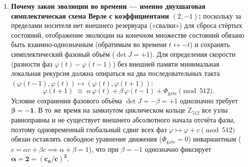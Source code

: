 \begin{enumerate}[label=\textbf{Шаг \arabic*.},leftmargin=*]
\begin{itemize}[noitemsep]
  \item $\mathbf{O_2(3)}$ ($|\mathbf{e}|^2 = d - 1 = 2$, $\mathbf{12}$~\textbf{рёберных диагональных соседей} $(\pm 1,\pm 1,0)$, $(\pm 1,0,\pm 1)$, $(0,\pm 1,\pm 1)$ --- архимедов \textbf{кубооктаэдр}): в каждой координатной плоскости содержит ровно $4$ вершины экваториального квадрата, а вдоль каждой оси $e_\alpha$ имеет $8$ вершин с $e_\alpha = \pm 1$ и $4$ вершины с $e_\alpha = 0$, что даёт изотропный тензор второго момента
    \begin{equation}
      \label{eq:mono-isotropy-tensor}
      M_{\alpha\beta} \;=\; \sum_{\mathbf{e} \in O_2(3)} e_\alpha e_\beta \;=\; (4 + 4)\,\delta_{\alpha\beta} \;=\; 8\,\delta_{\alpha\beta} \;=\; |{\triangle}(3)|\,\delta_{\alpha\beta}
    \end{equation}
    и ненулевое межосевое сцепление $\sum_{\mathbf{e}\in O_2(3)} e_x^2 e_y^2 = 4 = \frac{1}{2}\sum_{\mathbf{e}\in O_2(3)} e_x^4$, благодаря чему оператор $\frac{1}{4}\sum_{\mathbf{e}\in O_2(3)}(f(\mathbf{e}) - f(\mathbf{0}))$ точно равна непрерывному лапласиану $\Delta f(\mathbf{0})$ на всех квадратичных полиномах.
  \end{itemize}

\item \textbf{Почему закон эволюции во времени --- именно двухшаговая симплектическая схема Верле с коэффициентами $(2, -1)$:}
  поскольку за пределами носителя нет внешнего резервуара («свалки») для сброса стёртых состояний, отображение эволюции на конечном множестве состояний обязано быть взаимно-однозначным (обратимым во времени $t \leftrightarrow -t$) и сохранять симплектический фазовый объём ($\det J = +1$). Для определения скорости (разности фаз $\varphi(t) - \varphi(t-1)$) без внешней памяти минимальная локальная рекурсия должна опираться на два последовательных такта $(\varphi(t-1), \varphi(t)) \mapsto (\varphi(t), \varphi(t+1))$:
  \[
    \varphi(t+1) \;\equiv\; \alpha\,\varphi(t) + \beta\,\varphi(t-1) + \Phi_{\mathrm{gate}} \pmod{512}.
  \]
  Условие сохранения фазового объёма $\det J = -\beta = +1$ однозначно требует $\mathbf{\beta = -1}$. В то же время на замкнутом циклическом кольце $\mathbb{Z}_{512}$ все узлы равноправны и не существует внешнего абсолютного начала отсчёта фазы, поэтому одновременный глобальный сдвиг всех фаз $\varphi \mapsto \varphi + c \pmod{512}$ обязан оставлять свободное уравнение движения ($\Phi_{\mathrm{gate}} = 0$) инвариантным ($c = \alpha c + \beta c \implies \alpha + \beta = 1$), что при $\beta = -1$ однозначно фиксирует $\mathbf{\alpha = 2 = (c_0/c)^2}$.


\end{enumerate}
